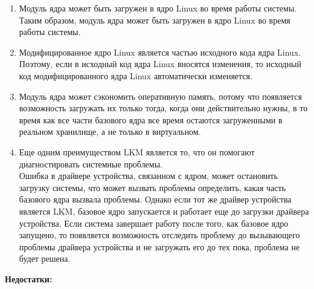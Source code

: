 \begin{enumerate}
    \item Модуль ядра может быть загружен в ядро Linux во время работы системы. \vspace{5mm}\\
    Таким образом, модуль ядра может быть загружен в ядро Linux во время работы системы.
    \item Модифицированное ядро Linux является частью исходного кода ядра Linux. \vspace{5mm}\\
    Поэтому, если в исходный код ядра Linux вносятся изменения, то исходный код модифицированного ядра Linux автоматически изменяется.
    \item Модуль ядра может сэкономить оперативную память,
    потому что появляется возможность загружать их только тогда, когда они действительно нужны, в то время как
    все части базового ядра все время остаются загруженными в реальном хранилище, а не только в виртуальном.
    \item Еще одним преимуществом LKM является то, что он помогают диагностировать системные проблемы. \vspace{5mm}\\
    Ошибка в драйвере устройства, связанном с ядром, может остановить загрузку системы, что может вызвать проблемы определить, какая часть базового ядра вызвала проблемы.
    Однако если тот же драйвер устройства является LKM, базовое ядро запускается и работает еще до загрузки драйвера устройства.
    Если система завершает работу после того, как базовое ядро запущено, то появляется возможность отследить проблему до вызывающего проблемы драйвера устройства и не загружать его до тех пока, проблема не будет решена.\\
\end{enumerate}
\textbf{Недостатки:}

